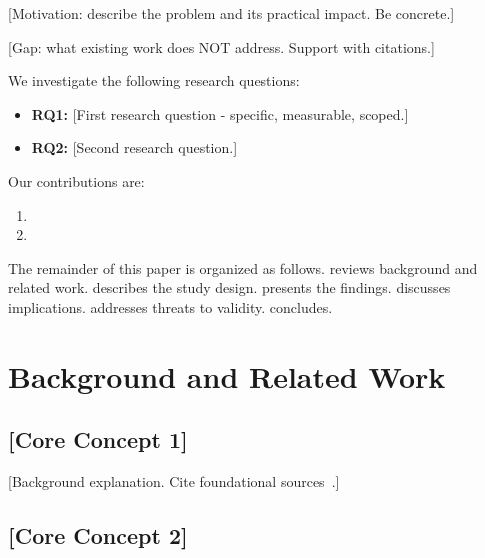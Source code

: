 \documentclass[11pt,a4paper]{article}
\begin{document}
[Motivation: describe the problem and its practical impact. Be concrete.]

[Gap: what existing work does NOT address. Support with citations.]

We investigate the following research questions:

\begin{itemize}
  \item \textbf{RQ1:} [First research question - specific, measurable, scoped.]
  \item \textbf{RQ2:} [Second research question.]
\end{itemize}

Our contributions are:
\begin{enumerate}
  \item [First contribution - specific and verifiable.]
  \item [Second contribution.]
\end{enumerate}

The remainder of this paper is organized as follows.
 reviews background and related work.
 describes the study design.
 presents the findings.
 discusses implications.
 addresses threats to validity.
 concludes.


\section{Background and Related Work}
\label{sec:background}

\subsection{[Core Concept 1]}
\label{sec:background-concept1}

[Background explanation. Cite foundational sources~\cite{FIXME}.]

\subsection{[Core Concept 2]}
\label{sec:background-concept2}
\end{document}
